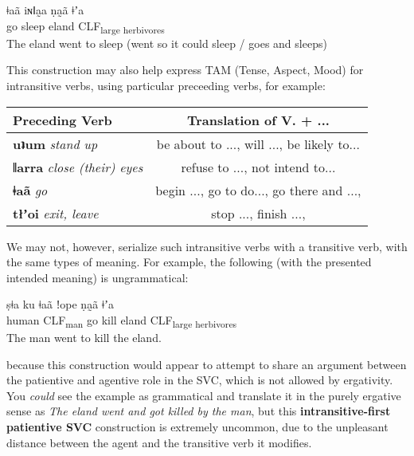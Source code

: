 \documentclass[11pt,a5paper]{book}
\newcommand{\qcn}[1]{\textcolor{AccentText}{\large\textbf{#1}}}
\newcommand{\transl}[2]{\qcn{#1} \emph{#2}}
\newcommand{\grammsc}[1]{\textsc{#1}}
\newcommand{\CLF}[1]{\grammsc{CLF}\textsubscript{#1}}
\begin{document}
\begin{exe}
\ex
\gll ǂaã iɴǁa̰a ṇa̰ã ǂʼa \\
go sleep eland \CLF{large herbivores}\\
\glt The eland went to sleep (went so it could sleep / goes and sleeps)
\end{exe}

This construction may also help express TAM (Tense, Aspect, Mood) for intransitive verbs, using particular preceeding verbs, for example:

\begin{center}
\begin{tabular}{|l|c|}
\hline
Preceding Verb  & Translation of V. + ...\\ \hline\hline
 \transl{uʇum}{stand up} & be about to ..., will ..., be likely to...\\ \hline
\transl{ǁarra}{close (their) eyes} & refuse to ..., not intend to...\\ \hline
\transl{ǂaã}{go} & begin ..., go to do..., go there and ..., \\ \hline
\transl{tłʼoi}{exit, leave} & stop ..., finish ..., \\ \hline
\end{tabular}
\end{center}

We may not, however, serialize such intransitive verbs with a transitive verb, with the same types of meaning. For example, the following (with the presented intended meaning) is ungrammatical:

\begin{exe}
\ex
\gll *ṣǂa ku ǂaã ǃope ṇa̰ã ǂʼa \\
human \CLF{man} go kill eland \CLF{large herbivores}\\
\glt *The man went to kill the eland.
\end{exe}

because this construction would appear to attempt to share an argument between the patientive and agentive role in the SVC, which is not allowed by ergativity. You \emph{could} see the example as grammatical and translate it in the purely ergative sense as \transl{}{The eland went and got killed by the man}, but this \textbf{intransitive-first patientive SVC} construction is extremely uncommon, due to the unpleasant distance between the agent and the transitive verb it modifies. 
\end{document}
